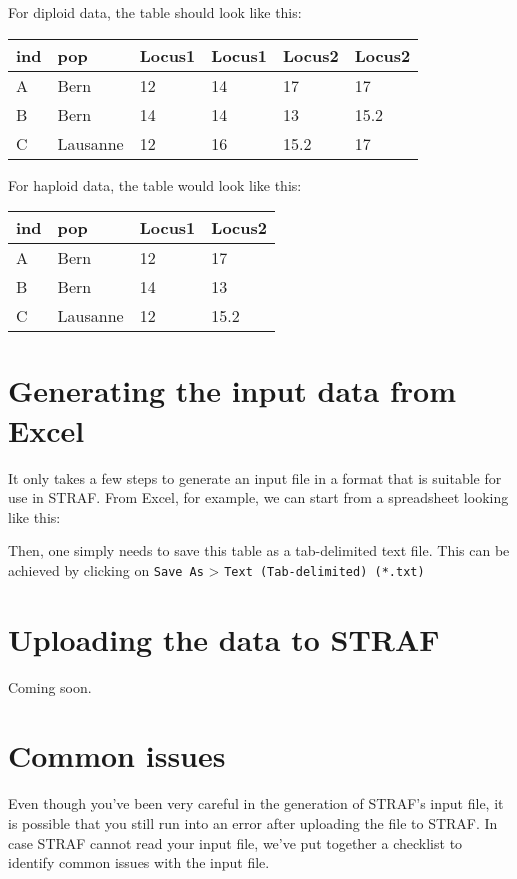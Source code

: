 \documentclass[
]{book}
\begin{document}
For diploid data, the table should look like this:

\begin{longtable}[]{@{}llllll@{}}
\toprule
ind & pop & Locus1 & Locus1 & Locus2 & Locus2\tabularnewline
\midrule
\endhead
A & Bern & 12 & 14 & 17 & 17\tabularnewline
B & Bern & 14 & 14 & 13 & 15.2\tabularnewline
C & Lausanne & 12 & 16 & 15.2 & 17\tabularnewline
\bottomrule
\end{longtable}

For haploid data, the table would look like this:

\begin{longtable}[]{@{}llll@{}}
\toprule
ind & pop & Locus1 & Locus2\tabularnewline
\midrule
\endhead
A & Bern & 12 & 17\tabularnewline
B & Bern & 14 & 13\tabularnewline
C & Lausanne & 12 & 15.2\tabularnewline
\bottomrule
\end{longtable}

\hypertarget{generating-the-input-data-from-excel}{%
\section{Generating the input data from Excel}\label{generating-the-input-data-from-excel}}

It only takes a few steps to generate an input file in a format that is suitable
for use in STRAF. From Excel, for example, we can start from a spreadsheet looking
like this:

Then, one simply needs to save this table as a tab-delimited text file. This can be
achieved by clicking on \texttt{Save\ As} \textgreater{} \texttt{Text\ (Tab-delimited)\ (*.txt)}

\hypertarget{uploading-the-data-to-straf}{%
\section{Uploading the data to STRAF}\label{uploading-the-data-to-straf}}

Coming soon.

\hypertarget{common-issues}{%
\section{Common issues}\label{common-issues}}

Even though you've been very careful in the generation of STRAF's input file,
it is possible that you still run into an error after uploading the file to STRAF.
In case STRAF cannot read your input file, we've put together a checklist to identify
common issues with the input file.
\end{document}
